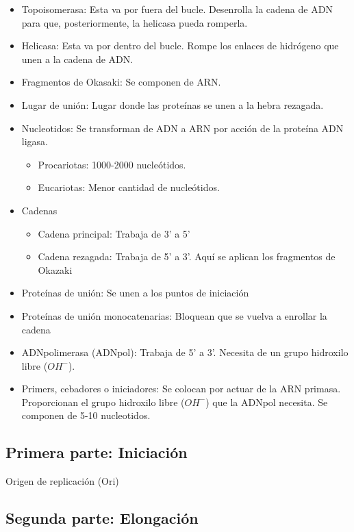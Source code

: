 \begin{itemize}
    \item Topoisomerasa: Esta va  por fuera del bucle. Desenrolla la cadena de ADN para que, posteriormente, la helicasa pueda romperla.
    \item Helicasa: Esta va por dentro del bucle. Rompe los enlaces de hidrógeno que unen a la cadena de ADN.
    \item Fragmentos de Okasaki: Se componen de ARN.
    \item Lugar de unión: Lugar donde las proteínas se unen a la hebra rezagada.
    \item Nucleotidos: Se transforman de ADN a ARN por acción de la proteína ADN ligasa. 
        \begin{itemize}
            \item Procariotas: 1000-2000 nucleótidos.
            \item Eucariotas: Menor cantidad de nucleótidos.
        \end{itemize}
        
    \item Cadenas
        \begin{itemize}
            \item Cadena principal: Trabaja de 3' a 5'
            \item Cadena rezagada: Trabaja de 5' a 3'. Aquí se aplican los fragmentos de Okazaki
        \end{itemize}
    \item Proteínas de unión: Se unen a los puntos de iniciación
    \item Proteínas de unión monocatenarias: Bloquean que se vuelva a enrollar la cadena
    \item ADNpolimerasa (ADNpol): Trabaja de 5' a 3'. Necesita de un grupo hidroxilo libre ($OH^{-}$).
    \item Primers, cebadores o iniciadores: Se colocan por actuar de la ARN primasa. Proporcionan el grupo hidroxilo libre ($OH^{-}$) que la ADNpol necesita. Se componen de 5-10 nucleotidos.
\end{itemize}

\subsection{Primera parte: Iniciación}

Origen de replicación (Ori)

\subsection{Segunda parte: Elongación}



